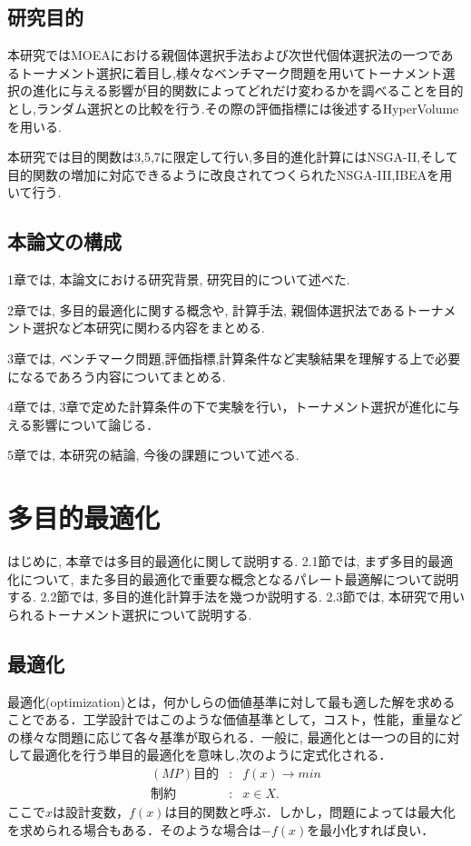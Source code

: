 \documentclass[12pt,a4j,notitlepage]{jreport}
\begin{document}
\section{研究目的}
本研究ではMOEAにおける親個体選択手法および次世代個体選択法の一つであるトーナメント選択に着目し,様々なベンチマーク問題を用いてトーナメント選択の進化に与える影響が目的関数によってどれだけ変わるかを調べることを目的とし,ランダム選択との比較を行う.その際の評価指標には後述するHyperVolumeを用いる.

本研究では目的関数は3,5,7に限定して行い,多目的進化計算にはNSGA-II,そして目的関数の増加に対応できるように改良されてつくられたNSGA-III,IBEAを用いて行う.

\section{本論文の構成}
1章では, 本論文における研究背景, 研究目的について述べた.

2章では, 多目的最適化に関する概念や, 計算手法, 親個体選択法であるトーナメント選択など本研究に関わる内容をまとめる.

3章では, ベンチマーク問題,評価指標,計算条件など実験結果を理解する上で必要になるであろう内容についてまとめる.

4章では, 3章で定めた計算条件の下で実験を行い，トーナメント選択が進化に与える影響について論じる．

5章では, 本研究の結論, 今後の課題について述べる.

\chapter{多目的最適化}
はじめに, 本章では多目的最適化に関して説明する.
2.1節では, まず多目的最適化について, また多目的最適化で重要な概念となるパレート最適解について説明する.
2.2節では, 多目的進化計算手法を幾つか説明する.
2.3節では, 本研究で用いられるトーナメント選択について説明する.


\section{最適化}
最適化(optimization)とは，何かしらの価値基準に対して最も適した解を求めることである．工学設計ではこのような価値基準として，コスト，性能，重量などの様々な問題に応じて各々基準が取られる．一般に, 最適化とは一つの目的に対して最適化を行う単目的最適化を意味し,次のように定式化される．
\begin{eqnarray}
(MP)         目的&:& f(x)　→　min\\
         制約&:&x    \in  X.
\end{eqnarray}
ここで$x$は設計変数，$f(x)$は目的関数と呼ぶ．しかし，問題によっては最大化を求められる場合もある．そのような場合は$-f(x)$を最小化すれば良い．
\end{document}
